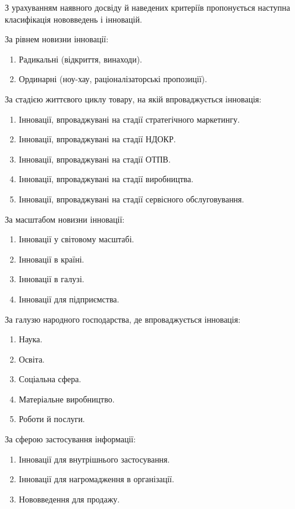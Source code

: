 З урахуванням наявного досвіду й наведених критеріїв пропонується наступна класифікація нововведень і інновацій.

За рівнем новизни інновації:

\begin{enumerate}
	\item Радикальні (відкриття, винаходи).
	\item Ординарні (ноу-хау, раціоналізаторські пропозиції).
\end{enumerate}

За стадією життєвого циклу товару, на якій впроваджується інновація:

\begin{enumerate}
	\item Інновації, впроваджувані на стадії стратегічного маркетингу.
	\item Інновації, впроваджувані на стадії НДОКР.
	\item Інновації, впроваджувані на стадії ОТПВ.
	\item Інновації, впроваджувані на стадії виробництва.
	\item Інновації, впроваджувані на стадії сервісного обслуговування.
\end{enumerate}

За масштабом новизни інновації:

\begin{enumerate}
	\item Інновації у світовому масштабі.
	\item Інновації в країні.
	\item Інновації в галузі.
	\item Інновації для підприємства.
\end{enumerate}

За галузю народного господарства, де впроваджується інновація:

\begin{enumerate}
	\item Наука.
	\item Освіта.
	\item Соціальна сфера.
	\item Матеріальне виробництво.
	\item Роботи й послуги.
\end{enumerate}

За сферою застосування інформації:

\begin{enumerate}
	\item Інновації для внутрішнього застосування.
	\item Інновації для нагромадження в організації.
	\item Нововведення для продажу.
\end{enumerate}

